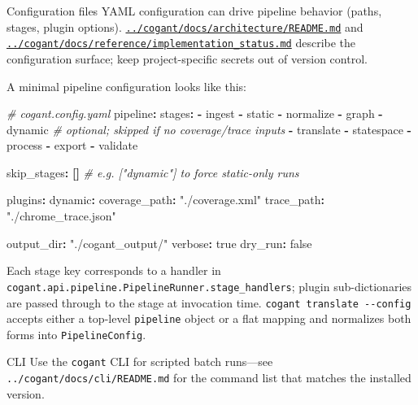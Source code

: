 \documentclass[
  ignorenonframetext,
]{beamer}
\newenvironment{Shaded}{}{}
\newcommand{\AttributeTok}[1]{\textcolor[rgb]{0.49,0.56,0.16}{#1}}
\newcommand{\CharTok}[1]{\textcolor[rgb]{0.25,0.44,0.63}{#1}}
\newcommand{\CommentTok}[1]{\textcolor[rgb]{0.38,0.63,0.69}{\textit{#1}}}
\newcommand{\FunctionTok}[1]{\textcolor[rgb]{0.02,0.16,0.49}{#1}}
\newcommand{\KeywordTok}[1]{\textcolor[rgb]{0.00,0.44,0.13}{\textbf{#1}}}
\newcommand{\StringTok}[1]{\textcolor[rgb]{0.25,0.44,0.63}{#1}}
\begin{document}
\begin{frame}[fragile]{Configuration files}
\protect{}\label{configuration-files}
YAML configuration can drive pipeline behavior (paths, stages, plugin
options).
\href{../cogant/docs/architecture/README.md}{\texttt{../cogant/docs/architecture/README.md}}
and
\href{../cogant/docs/reference/implementation_status.md}{\texttt{../cogant/docs/reference/implementation\_status.md}}
describe the configuration surface; keep project-specific secrets out of
version control.

A minimal pipeline configuration looks like this:

\begin{Shaded}
\begin{Highlighting}[]
\CommentTok{\# cogant.config.yaml}
\FunctionTok{pipeline}\KeywordTok{:}
\AttributeTok{  }\FunctionTok{stages}\KeywordTok{:}
\AttributeTok{    }\KeywordTok{{-}}\AttributeTok{ ingest}
\AttributeTok{    }\KeywordTok{{-}}\AttributeTok{ static}
\AttributeTok{    }\KeywordTok{{-}}\AttributeTok{ normalize}
\AttributeTok{    }\KeywordTok{{-}}\AttributeTok{ graph}
\AttributeTok{    }\KeywordTok{{-}}\AttributeTok{ dynamic}\CommentTok{       \# optional; skipped if no coverage/trace inputs}
\AttributeTok{    }\KeywordTok{{-}}\AttributeTok{ translate}
\AttributeTok{    }\KeywordTok{{-}}\AttributeTok{ statespace}
\AttributeTok{    }\KeywordTok{{-}}\AttributeTok{ process}
\AttributeTok{    }\KeywordTok{{-}}\AttributeTok{ export}
\AttributeTok{    }\KeywordTok{{-}}\AttributeTok{ validate}

\AttributeTok{  }\FunctionTok{skip\_stages}\KeywordTok{:}\AttributeTok{ }\KeywordTok{[]}\CommentTok{   \# e.g. ["dynamic"] to force static{-}only runs}

\AttributeTok{  }\FunctionTok{plugins}\KeywordTok{:}
\AttributeTok{    }\FunctionTok{dynamic}\KeywordTok{:}
\AttributeTok{      }\FunctionTok{coverage\_path}\KeywordTok{:}\AttributeTok{ }\StringTok{"./coverage.xml"}
\AttributeTok{      }\FunctionTok{trace\_path}\KeywordTok{:}\AttributeTok{ }\StringTok{"./chrome\_trace.json"}

\AttributeTok{  }\FunctionTok{output\_dir}\KeywordTok{:}\AttributeTok{ }\StringTok{"./cogant\_output/"}
\AttributeTok{  }\FunctionTok{verbose}\KeywordTok{:}\AttributeTok{ }\CharTok{true}
\AttributeTok{  }\FunctionTok{dry\_run}\KeywordTok{:}\AttributeTok{ }\CharTok{false}
\end{Highlighting}
\end{Shaded}

Each stage key corresponds to a handler in
\texttt{cogant.api.pipeline.PipelineRunner.stage\_handlers}; plugin
sub-dictionaries are passed through to the stage at invocation time.
\texttt{cogant\ translate\ -\/-config} accepts either a top-level
\texttt{pipeline} object or a flat mapping and normalizes both forms
into \texttt{PipelineConfig}.
\end{frame}

\begin{frame}[fragile]{CLI}
\protect{}\label{cli}
Use the \texttt{cogant} CLI for scripted batch runs---see
\texttt{../cogant/docs/cli/README.md} for the command list that matches
the installed version.
\end{frame}
\end{document}
